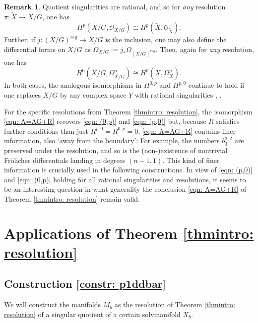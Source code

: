 \documentclass[12pt,reqno]{amsart}
\theoremstyle{definition}
\newtheorem{rem}[thm]{Remark}
\newcommand{\Oh}{\mathcal{O}}
\begin{document}
\begin{rem}
     Quotient singularities are rational, and so for \textit{any} resolution $\pi:\tilde X\to X/G$, one has 
     \begin{equation}\label{eqn: (0,p)}
         H^p(X/G,\Oh_{X/G})\cong H^p(\tilde X,\Oh_{\tilde X}).
     \end{equation} 
     Further, if $j:(X/G)^{reg}\to X/G$ is the inclusion, one may also define the differential forms on $X/G$ as $\Omega_{X/G}:=j_*\Omega_{(X/G)^{reg}}$. Then, again for \textit{any} resolution, one has 
     \begin{equation}\label{eqn: (p,0)}
         H^0(X/G,\Omega_{X/G}^p)\cong H^0(\tilde X,\Omega_X^p).
     \end{equation}
     In both cases, the analogous isomorphisms in $H^{0,p}$ and $H^{p,0}$ continue to hold if one replaces $X/G$ by any complex space $Y$ with rational singularities \cite{KS21}, \cite{GKK10}.
     
    For the specific resolutions from Theorem \ref{thmintro: resolution}, the isomorphism \eqref{eqn: A=AG+R} recovers \eqref{eqn: (0,p)} and \eqref{eqn: (p,0)} but, because $R$ satisfies further conditions than just $R^{p,0}=R^{0,p}=0$, \eqref{eqn: A=AG+R} contains finer information, also `away from the boundary': For example, the numbers $b_3^{2,2}$ are preserved under the resolution, and so is the (non-)existence of nontrivial Fr\"olicher differentials landing in degrees $(n-1,1)$. This kind of finer information is crucially used in the following constructions. In view of \eqref{eqn: (p,0)} and \eqref{eqn: (0,p)} holding for all rational singularities and resolutions, it seems to be an interesting question in what generality the conclusion \eqref{eqn: A=AG+R} of Theorem \ref{thmintro: resolution} remain valid.
\end{rem}

\section{Applications of Theorem \ref{thmintro: resolution}}
\subsection{Construction \ref{constr: p1ddbar}}\label{sec: constr p1ddbar}
We will construct the manifolds $M_b$ as the resolution of Theorem \ref{thmintro: resolution} of a singular quotient of a certain solvmanifold $X_b$.
\end{document}
